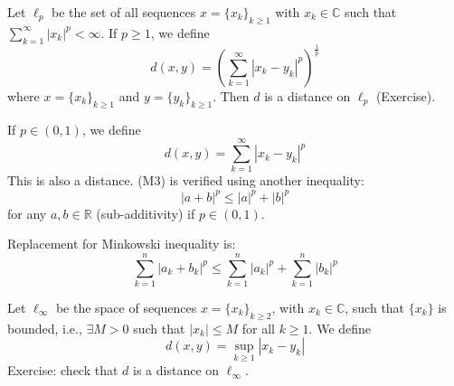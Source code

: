 \begin{remark}
Let $\ell_p$ be the set of all sequences $x=\{x_k\}_{k\geq 1}$ with $x_k \in \mathbb{C}$ such that $\sum_{k=1}^{\infty} |x_k|^p < \infty$. If $p \geq 1$, we define
\[ d(x,y) = \left( \sum_{k=1}^{\infty} |x_k - y_k|^p \right)^{\frac{1}{p}} \]
where $x=\{x_k\}_{k\geq 1}$ and $y=\{y_k\}_{k\geq 1}$. Then $d$ is a distance on $\ell_p$ (Exercise).
\end{remark}

\begin{remark}
If $p \in (0,1)$, we define
\[ d(x,y) = \sum_{k=1}^{\infty} |x_k - y_k|^p \]
This is also a distance. (M3) is verified using another inequality:
\[ |a+b|^p \leq |a|^p + |b|^p \]
for any $a,b \in \mathbb{R}$ (sub-additivity) if $p \in (0,1)$.

Replacement for Minkowski inequality is:
\[ \sum_{k=1}^n |a_k+b_k|^p \leq \sum_{k=1}^n |a_k|^p + \sum_{k=1}^n |b_k|^p \]
\end{remark}

\begin{remark}
Let $\ell_\infty$ be the space of sequences $x=\{x_k\}_{k\geq 2}$, with $x_k \in \mathbb{C}$, such that $\{x_k\}$ is bounded, i.e., $\exists M>0$ such that $|x_k| \leq M$ for all $k\geq 1$.
We define
\[ d(x,y) = \sup_{k \geq 1} |x_k - y_k| \]
Exercise: check that $d$ is a distance on $\ell_\infty$.
\end{remark}
